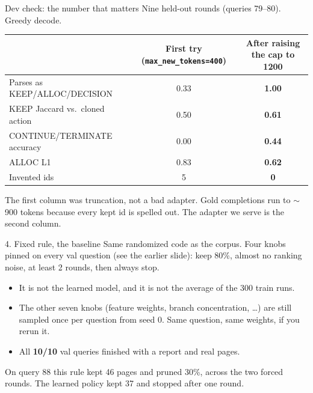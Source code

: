 \documentclass[aspectratio=169,11pt]{beamer}
\begin{document}
\begin{frame}{Dev check: the number that matters}
  Nine held-out rounds (queries 79--80). Greedy decode.
  \vspace{0.3em}
  \begin{tabular}{lcc}
    \hline
    & First try (\texttt{max\_new\_tokens=400}) & After raising the cap to 1200 \\
    \hline
    Parses as KEEP/ALLOC/DECISION & 0.33 & \textbf{1.00} \\
    KEEP Jaccard vs.\ cloned action & 0.50 & \textbf{0.61} \\
    CONTINUE/TERMINATE accuracy & 0.00 & \textbf{0.44} \\
    ALLOC L1 & 0.83 & \textbf{0.62} \\
    Invented ids & 5 & \textbf{0} \\
    \hline
  \end{tabular}
  \vspace{0.4em}
  The first column was truncation, not a bad adapter. Gold completions run to $\sim$900 tokens because every kept id is spelled out. The adapter we serve is the second column.
\end{frame}

\begin{frame}{4. Fixed rule, the baseline}
  Same randomized code as the corpus. Four knobs pinned on every val question (see the earlier slide): keep 80\%, almost no ranking noise, at least 2 rounds, then always stop.
  \vspace{0.4em}
  \begin{itemize}
    \item It is not the learned model, and it is not the average of the 300 train runs.
    \item The other seven knobs (feature weights, branch concentration, \ldots) are still sampled once per question from seed 0. Same question, same weights, if you rerun it.
    \item All \textbf{10/10} val queries finished with a report and real pages.
  \end{itemize}
  \vspace{0.3em}
  On query 88 this rule kept 46 pages and pruned 30\%, across the two forced rounds. The learned policy kept 37 and stopped after one round.
\end{frame}
\end{document}
